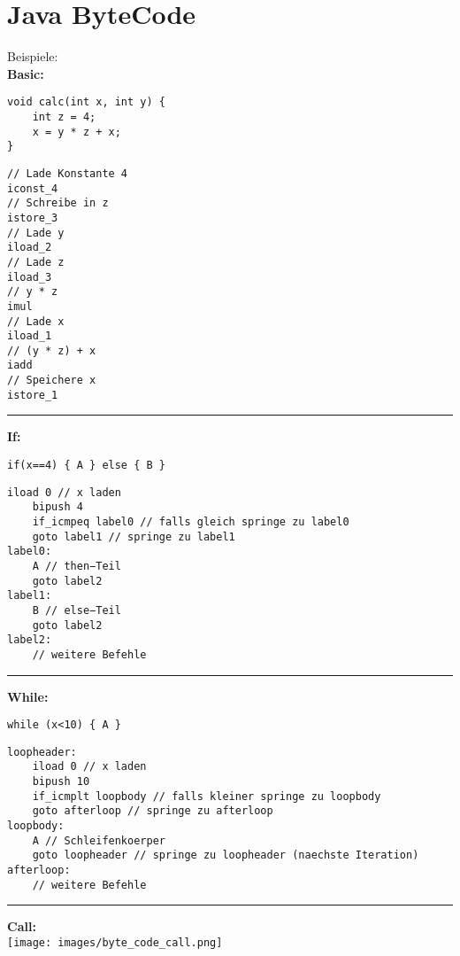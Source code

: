 \appendix\section{Java  ByteCode}
Beispiele:\\
\textbf{Basic:}
\begin{verbatim}
void calc(int x, int y) {
    int z = 4;
    x = y * z + x; 
}
\end{verbatim}
\begin{lstlisting}[language=JVMIS]
// Lade Konstante 4
iconst_4
// Schreibe in z
istore_3
// Lade y
iload_2
// Lade z
iload_3
// y * z
imul
// Lade x 
iload_1
// (y * z) + x 
iadd
// Speichere x
istore_1
\end{lstlisting}
\noindent\rule{\columnwidth}{0.4pt}
\textbf{If:}
\begin{verbatim}
if(x==4) { A } else { B }
\end{verbatim}
\begin{lstlisting}[language=JVMIS]
    iload 0 // x laden
    bipush 4
    if_icmpeq label0 // falls gleich springe zu label0 
    goto label1 // springe zu label1
label0:
    A // then−Teil
    goto label2 
label1:
    B // else−Teil
    goto label2 
label2:
    // weitere Befehle
\end{lstlisting}
\noindent\rule{\columnwidth}{0.4pt}
\textbf{While:}
\begin{verbatim}
while (x<10) { A }
\end{verbatim}
\begin{lstlisting}[language=JVMIS]
loopheader:
    iload 0 // x laden
    bipush 10
    if_icmplt loopbody // falls kleiner springe zu loopbody 
    goto afterloop // springe zu afterloop
loopbody:
    A // Schleifenkoerper
    goto loopheader // springe zu loopheader (naechste Iteration) 
afterloop:
    // weitere Befehle
\end{lstlisting}
\noindent\rule{\columnwidth}{0.4pt}
\textbf{Call:}\\
\texttt{[image: images/byte\_code\_call.png]}